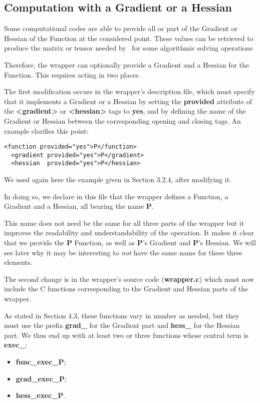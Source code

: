\subsection{Computation with a Gradient or a Hessian}

Some computational codes are able to provide all or part of the Gradient or Hessian of the Function at the considered point. These values can be retrieved to produce the matrix or tensor needed by \OT\ for some algorithmic solving operations%

Therefore, the wrapper can optionally provide a Gradient and a Hessian for the Function. This requires acting in two places.

The first modification occurs in the wrapper's description file, which must specify that it implements a Gradient or a Hessian by setting the {\bf provided} attribute of the {\bf <gradient>} or {\bf <hessian>} tags to {\bf yes}, and by defining the name of the Gradient or Hessian between the corresponding opening and closing tags. An example clarifies this point:

\lstset{language=XML, basicstyle=\normalsize}
\begin{lstlisting}[frame=TBRL]
  <function provided="yes">P</function>
  <gradient provided="yes">P</gradient>
  <hessian  provided="yes">P</hessian>
\end{lstlisting}

We used again here the example given in Section 3.2.4, after modifying it.

In doing so, we declare in this file that the wrapper defines a Function, a Gradient and a Hessian, all bearing the name {\bf P}.

This name does not need be the same for all three parts of the wrapper but it improves the readability and understandability of the operation. It makes it clear that we provide the {\bf P} Function, as well as {\bf P}'s Gradient and {\bf P}'s Hessian. We will see later why it may be interesting to \emph{not} have the same name for these three elements.

The second change is in the wrapper's source code ({\bf wrapper.c}) which must now include the C functions corresponding to the Gradient and Hessian parts of the wrapper.

As stated in Section 4.3, these functions vary in number as needed, but they must use the prefix {\bf grad\_} for the Gradient part and {\bf hess\_} for the Hessian part. We thus end up with at least two or three functions whose central term is {\bf exec\_}:
\begin{itemize}
\item {\bf func\_exec\_P};
\item {\bf grad\_exec\_P};
\item {\bf hess\_exec\_P}.
\end{itemize}

